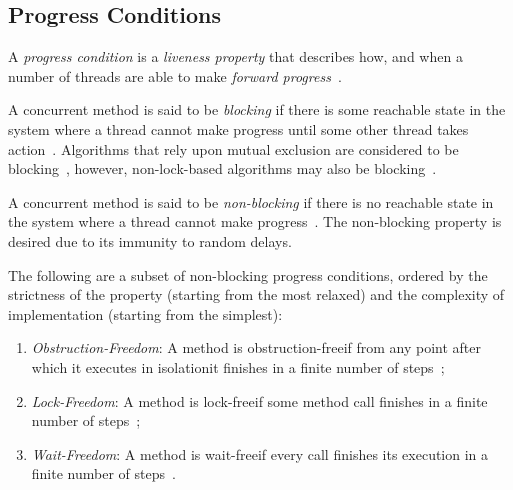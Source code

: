 
\subsection{Progress Conditions}
A \emph{progress condition} is a \emph{liveness property} that describes how,
and when a number of threads are able to make \emph{forward
progress}~\citep[Section~3.2]{scott2013shared}.

A concurrent method is said to be \emph{blocking} if there is some reachable
state in the system where a thread cannot make progress until some other thread
takes action~\citep[Section~3.2]{scott2013shared}. Algorithms that rely upon
mutual exclusion are considered to be
blocking~\citep[Section~3.2]{scott2013shared}, however, non-lock-based
algorithms may also be blocking~\citep{mellor1987concurrent}.

A concurrent method is said to be \emph{non-blocking} if there is no reachable
state in the system where a thread cannot make
progress~\cite[Section~3.2]{scott2013shared}. The non-blocking property is
desired due to its immunity to random delays. %

The following are a subset of non-blocking progress conditions, ordered by the
strictness of the property (starting from the most relaxed) and the complexity of
implementation (starting from the simplest):

\begin{enumerate}
\item \emph{Obstruction-Freedom}: A method is obstruction-free\textemdash if from any
point after which it executes in isolation\textemdash it finishes in a finite number of
steps~\citep[Section~3.8.3]{herlihy2020art};
\item \emph{Lock-Freedom}: A method is lock-free\textemdash if \textemdash some method call finishes
in a finite number of steps~\citep[Section~3.8.2]{herlihy2020art};
\item \emph{Wait-Freedom}: A method is wait-free\textemdash if \textemdash every call finishes its
execution in a finite number of steps~\citep[Section~3.8.1]{herlihy2020art}.
\end{enumerate}

